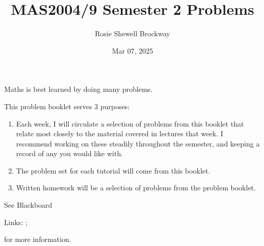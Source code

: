 \documentclass[letterpaper,10pt,english]{jupyterBook}
\title{MAS2004/9 Semester 2 Problems}
\date{Mar 07, 2025}
\author{Rosie Shewell Brockway}
\begin{document}
\pagestyle{empty}
\sphinxmaketitle
\pagestyle{plain}
\sphinxtableofcontents
\pagestyle{normal}
\label{\detokenize{intro::doc}}


\sphinxAtStartPar
Maths is best learned by doing many problems.

\sphinxAtStartPar
This problem booklet serves 3 purposes:

\label{\detokenize{intro:pow}}\begin{enumerate}
%
\item {} 
\sphinxAtStartPar
{} 
Each week, I will circulate a selection of problems from this booklet that relate most closely to the material covered in lectures that week. I recommend working on these steadily throughout the semester, and keeping a record of any you would like  with.

\item {} 
\sphinxAtStartPar
{} 
The problem set for each tutorial will come from this booklet.

\item {} 
\sphinxAtStartPar
{} 
Written homework will be a selection of problems from the problem booklet. 

\end{enumerate}

\sphinxAtStartPar
See Blackboard%
\begin{footnote}[1]\sphinxAtStartFootnote
Links: ; 
%
\end{footnote} for more information.



\begin{DUlineblock}{0em}
\item[] 
\end{DUlineblock}

\sphinxAtStartPar
{\hyperref[\detokenize{Problems:prob}]{}} 
  {\hyperref[\detokenize{Problems:ch1prob}]{}} 
  {\hyperref[\detokenize{Problems:ch2prob}]{}} 
  {\hyperref[\detokenize{Problems:ch3prob}]{}} 
  {\hyperref[\detokenize{Problems:ch4prob}]{}} 
  {\hyperref[\detokenize{Problems:ch5prob}]{}} 
  {\hyperref[\detokenize{Problems:ch6prob}]{}}
\end{document}
